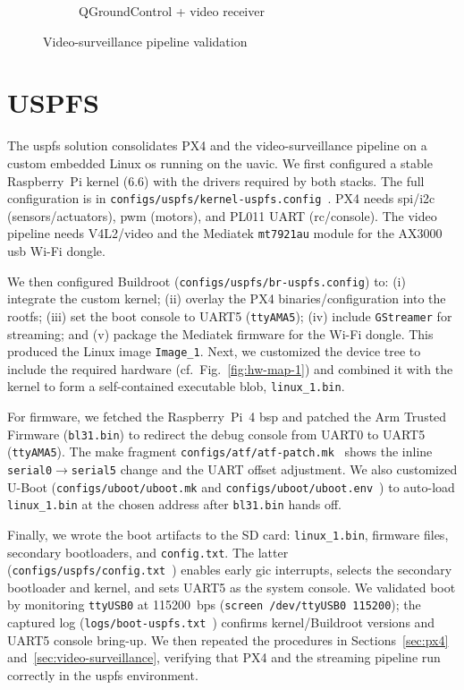 \begin{figure}[htb!]
\begin{subfigure}[t]{.48\textwidth}
    \caption{QGroundControl + video receiver}%
    \label{fig:px4-qgc-cam-1}
  \end{subfigure}
  \caption{Video-surveillance pipeline validation}%
  \label{fig:px4-qgc-cam}
\end{figure}

\section{USPFS}
\label{sec:uspfs-implem}
The \gls{uspfs} solution consolidates PX4 and the video-surveillance pipeline on
a custom embedded Linux \gls{os} running on the \gls{uavic}. We first configured
a stable Raspberry~Pi kernel (6.6) with the drivers required by both stacks.
The full configuration is in
\lstinline{configs/uspfs/kernel-uspfs.config}~\cite{thesis-sw-github}. PX4 needs
\gls{spi}/\gls{i2c} (sensors/actuators), \gls{pwm} (motors), and PL011 UART
(\gls{rc}/console). The video pipeline needs V4L2/video and the Mediatek
\lstinline{mt7921au} module for the AX3000 \gls{usb} Wi-Fi dongle.

We then configured Buildroot (\lstinline{configs/uspfs/br-uspfs.config}) to:
(i) integrate the custom kernel; (ii) overlay the PX4 binaries/configuration into
the rootfs; (iii) set the boot console to UART5 (\lstinline{ttyAMA5});
(iv) include \lstinline{GStreamer} for streaming; and (v) package the Mediatek
firmware for the Wi-Fi dongle. This produced the Linux image
\lstinline{Image_1}. Next, we customized the device tree to include the required
hardware (cf.\ Fig.~\ref{fig:hw-map-1}) and combined it with the kernel to form
a self-contained executable blob, \lstinline{linux_1.bin}.

For firmware, we fetched the Raspberry~Pi~4 \gls{bsp} and patched the Arm
Trusted Firmware (\lstinline{bl31.bin}) to redirect the debug console from
UART0 to UART5 (\lstinline{ttyAMA5}). The make fragment
\lstinline{configs/atf/atf-patch.mk}~\cite{thesis-sw-github} shows the inline
\lstinline{serial0}\(\rightarrow\)\lstinline{serial5} change and the UART offset
adjustment. We also customized U-Boot
(\lstinline{configs/uboot/uboot.mk} and \lstinline{configs/uboot/uboot.env}~\cite{thesis-sw-github})
to auto-load \lstinline{linux_1.bin} at the chosen address after
\lstinline{bl31.bin} hands off.

Finally, we wrote the boot artifacts to the SD card: \lstinline{linux_1.bin},
firmware files, secondary bootloaders, and \lstinline{config.txt}. The latter
(\lstinline{configs/uspfs/config.txt}~\cite{thesis-sw-github}) enables early \gls{gic}
interrupts, selects the secondary bootloader and kernel, and sets UART5 as the
system console. We validated boot by monitoring \lstinline{ttyUSB0} at 115200~bps
(\lstinline{screen /dev/ttyUSB0 115200}); the captured log
(\lstinline{logs/boot-uspfs.txt}~\cite{thesis-sw-github}) confirms kernel/Buildroot
versions and UART5 console bring-up. We then repeated the procedures in
Sections~\ref{sec:px4} and~\ref{sec:video-surveillance}, verifying that PX4 and
the streaming pipeline run correctly in the \gls{uspfs} environment.

